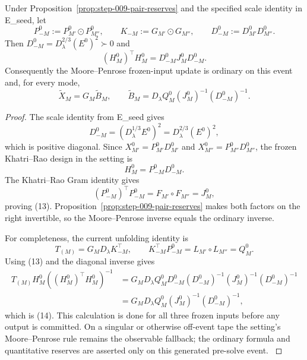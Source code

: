 \begin{lemma}\label{lem:step-009-congruence}
Under Proposition~\ref{prop:step-009-pair-reserves}
and the specified scale identity in E\_seed, let
\[
P_{-M}^0:=P_{M'}^0\odot P_{M''}^0,\qquad
K_{-M}:=G_{M'}\odot G_{M''},\qquad
D_{-M}^0:=D_{M'}^0D_{M''}^0.
\]
Then \(D_{-M}^0=D_\lambda^{2/3}(E^0)^2\succ0\) and
\[
(H_M^0)^\top H_M^0=D_{-M}^0J_M^0D_{-M}^0. \tag{13}
\]
Consequently the Moore--Penrose frozen-input update is ordinary on this
event and, for every mode,
\[
\widetilde X_M=G_M\widetilde B_M,\qquad
\widetilde B_M=D_\lambda Q_M^0(J_M^0)^{-1}(D_{-M}^0)^{-1}. \tag{14}
\]

\begin{proof}

The scale identity from E\_seed gives
\[
D_{-M}^0=(D_\lambda^{1/3}E^0)^2
=D_\lambda^{2/3}(E^0)^2,
\]
which is positive diagonal. Since
\(X_{M'}^0=P_{M'}^0D_{M'}^0\) and
\(X_{M''}^0=P_{M''}^0D_{M''}^0\), the frozen Khatri--Rao design in the
setting is
\[
H_M^0=P_{-M}^0D_{-M}^0.
\]
The Khatri--Rao Gram identity gives
\[
(P_{-M}^0)^\top P_{-M}^0
=F_{M'}\circ F_{M''}=J_M^0,
\]
proving (13). Proposition~\ref{prop:step-009-pair-reserves} makes both
factors on the right invertible, so the Moore--Penrose inverse equals the
ordinary inverse.

For completeness, the current unfolding identity is
\[
T_{(M)}=G_MD_\lambda K_{-M}^\top,\qquad
K_{-M}^\top P_{-M}^0=L_{M'}\circ L_{M''}=Q_M^0. \tag{15}
\]
Using (13) and the diagonal inverse gives
\[
\begin{aligned}
T_{(M)}H_M^0((H_M^0)^\top H_M^0)^{-1}
 &=G_MD_\lambda Q_M^0D_{-M}^0
   (D_{-M}^0)^{-1}(J_M^0)^{-1}(D_{-M}^0)^{-1}\\
 &=G_MD_\lambda Q_M^0(J_M^0)^{-1}(D_{-M}^0)^{-1},
\end{aligned}
\]
which is (14). This calculation is done for all three frozen inputs before
any output is committed. On a singular or otherwise off-event tape the
setting's Moore--Penrose rule remains the observable fallback; the ordinary
formula and quantitative reserves are asserted only on this generated
pre-solve event. \(\)


\end{proof}
\end{lemma}
